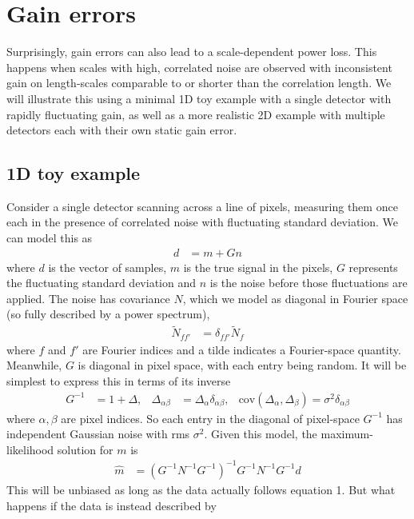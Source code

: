 \documentclass[twocolumn,apj]{aastex63}
\begin{document}
\section{Gain errors}
Surprisingly, gain errors can also lead to a scale-dependent power loss.
This happens when scales with high, correlated noise are observed with
inconsistent gain on length-scales comparable to or shorter than the
correlation length. We will illustrate this using a minimal 1D toy example
with a single detector with rapidly fluctuating gain, as well as a more
realistic 2D example with multiple detectors each with their own static
gain error.

\subsection{1D toy example}
Consider a single detector scanning across a line of pixels, measuring them
once each in the presence of correlated noise with fluctuating standard deviation.
We can model this as
\begin{align}
d &= m + G n \tag{1}
\end{align}
where $d$ is the vector of samples, $m$ is the true signal in the pixels,
$G$ represents the fluctuating standard deviation and $n$ is the noise
before those fluctuations are applied. The noise has covariance $N$,
which we model as diagonal in Fourier space (so fully described by
a power spectrum),
\begin{align}
\widetilde{N}_{ff'} &= \delta_{ff'} \widetilde{N}_f
\end{align}
where $f$ and $f'$ are Fourier indices and a tilde indicates a Fourier-space quantity.
Meanwhile, $G$ is diagonal in pixel space, with
each entry being random. It will be simplest to express this in terms
of its inverse
\begin{align}
G^{-1} &= 1 + \Delta, & \Delta_{\alpha\beta} &= \Delta_\alpha \delta_{\alpha\beta}, & \text{cov}(\Delta_\alpha,\Delta_\beta) = \sigma^2 \delta_{\alpha\beta}
\end{align}
where $\alpha, \beta$ are pixel indices.
So each entry in the diagonal of pixel-space $G^{-1}$ has independent Gaussian noise with rms $\sigma^2$.
Given this model, the maximum-likelihood solution for $m$ is
\begin{align}
\hat m &= (G^{-1}N^{-1}G^{-1})^{-1}G^{-1}N^{-1}G^{-1}d \tag{2}
\end{align}
This will be unbiased as long as the data actually follows equation 1. But what happens if the
data is instead described by
\end{document}
